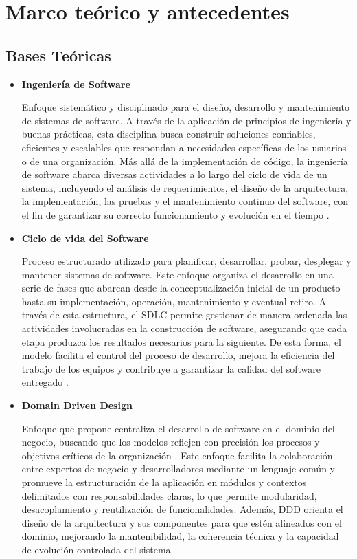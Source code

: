 
\section{Marco teórico y antecedentes}

\subsection{Bases Teóricas}

\begin{itemize}

    \item \textbf{Ingeniería de Software}  
    
    Enfoque sistemático y disciplinado para el diseño, desarrollo y mantenimiento de sistemas de software. A través de la aplicación de principios de ingeniería y buenas prácticas, esta disciplina busca construir soluciones confiables, eficientes y escalables que respondan a necesidades específicas de los usuarios o de una organización. Más allá de la implementación de código, la ingeniería de software abarca diversas actividades a lo largo del ciclo de vida de un sistema, incluyendo el análisis de requerimientos, el diseño de la arquitectura, la implementación, las pruebas y el mantenimiento continuo del software, con el fin de garantizar su correcto funcionamiento y evolución en el tiempo \citep{Jazayeri2003}.

    \item \textbf{Ciclo de vida del Software}  
    
    Proceso estructurado utilizado para planificar, desarrollar, probar, desplegar y mantener sistemas de software. Este enfoque organiza el desarrollo en una serie de fases que abarcan desde la conceptualización inicial de un producto hasta su implementación, operación, mantenimiento y eventual retiro. A través de esta estructura, el SDLC permite gestionar de manera ordenada las actividades involucradas en la construcción de software, asegurando que cada etapa produzca los resultados necesarios para la siguiente. De esta forma, el modelo facilita el control del proceso de desarrollo, mejora la eficiencia del trabajo de los equipos y contribuye a garantizar la calidad del software entregado \citep{Jazayeri2003}.

    \item \textbf{Domain Driven Design}  
    
    Enfoque que propone centraliza el desarrollo de software en el dominio del negocio, buscando que los modelos reflejen con precisión los procesos y objetivos críticos de la organización \citep{Vernon2013}. Este enfoque facilita la colaboración entre expertos de negocio y desarrolladores mediante un lenguaje común y promueve la estructuración de la aplicación en módulos y contextos delimitados con responsabilidades claras, lo que permite modularidad, desacoplamiento y reutilización de funcionalidades. Además, DDD orienta el diseño de la arquitectura y sus componentes para que estén alineados con el dominio, mejorando la mantenibilidad, la coherencia técnica y la capacidad de evolución controlada del sistema.


\end{itemize}
